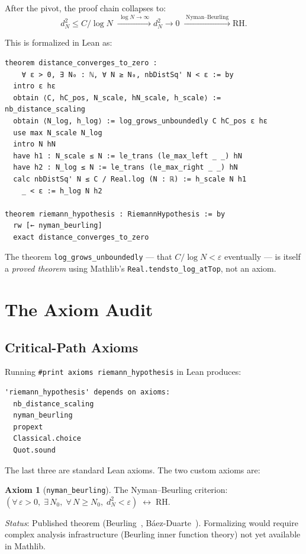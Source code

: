 \documentclass[11pt,a4paper]{article}
\theoremstyle{definition}
\newtheorem{axiombox}[theorem]{Axiom}
\theoremstyle{remark}
\newcommand{\lean}[1]{\texttt{#1}}
\begin{document}
After the pivot, the proof chain collapses to:
\[
  d_N^2 \leq C/\!\log N
  \;\xrightarrow{\;\log N \to \infty\;}
  d_N^2 \to 0
  \;\xrightarrow{\;\text{Nyman--Beurling}\;}
  \text{RH}.
\]

This is formalized in Lean as:

\begin{lstlisting}
theorem distance_converges_to_zero :
    ∀ ε > 0, ∃ N₀ : ℕ, ∀ N ≥ N₀, nbDistSq' N < ε := by
  intro ε hε
  obtain ⟨C, hC_pos, N_scale, hN_scale, h_scale⟩ := nb_distance_scaling
  obtain ⟨N_log, h_log⟩ := log_grows_unboundedly C hC_pos ε hε
  use max N_scale N_log
  intro N hN
  have h1 : N_scale ≤ N := le_trans (le_max_left _ _) hN
  have h2 : N_log ≤ N := le_trans (le_max_right _ _) hN
  calc nbDistSq' N ≤ C / Real.log (N : ℝ) := h_scale N h1
    _ < ε := h_log N h2

theorem riemann_hypothesis : RiemannHypothesis := by
  rw [← nyman_beurling]
  exact distance_converges_to_zero
\end{lstlisting}

The theorem \lean{log\_grows\_unboundedly} --- that $C/\!\log N < \varepsilon$
eventually --- is itself a \emph{proved theorem} using Mathlib's
\lean{Real.tendsto\_log\_atTop}, not an axiom.

\section{The Axiom Audit}\label{sec:audit}

\subsection{Critical-Path Axioms}

Running \texttt{\#print axioms riemann\_hypothesis} in Lean produces:

\begin{lstlisting}
'riemann_hypothesis' depends on axioms:
  nb_distance_scaling
  nyman_beurling
  propext
  Classical.choice
  Quot.sound
\end{lstlisting}

The last three are standard Lean axioms. The two custom axioms are:

\begin{axiombox}[\lean{nyman\_beurling}]
The Nyman--Beurling criterion:
$(\forall\,\varepsilon > 0,\; \exists\, N_0,\; \forall\, N \geq N_0,\;
d_N^2 < \varepsilon) \;\longleftrightarrow\; \mathrm{RH}$.

\smallskip\noindent
\emph{Status}: Published theorem (Beurling~\cite{beurling1955},
Báez-Duarte~\cite{baez-duarte2003}). Formalizing would require
complex analysis infrastructure (Beurling inner function theory)
not yet available in Mathlib.
\end{axiombox}
\end{document}
